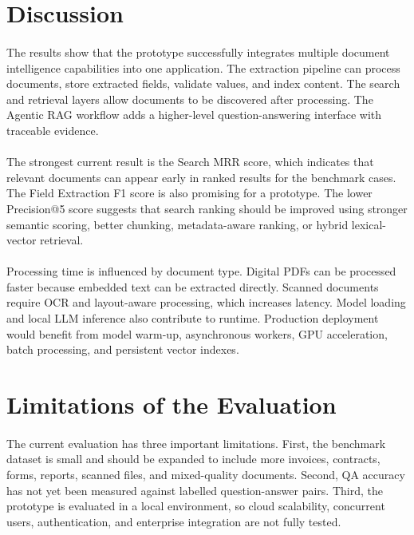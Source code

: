 \section{Discussion}
\paragraph{} The results show that the prototype successfully integrates multiple document intelligence capabilities into one application. The extraction pipeline can process documents, store extracted fields, validate values, and index content. The search and retrieval layers allow documents to be discovered after processing. The Agentic RAG workflow adds a higher-level question-answering interface with traceable evidence.

\paragraph{} The strongest current result is the Search MRR score, which indicates that relevant documents can appear early in ranked results for the benchmark cases. The Field Extraction F1 score is also promising for a prototype. The lower Precision@5 score suggests that search ranking should be improved using stronger semantic scoring, better chunking, metadata-aware ranking, or hybrid lexical-vector retrieval.

\paragraph{} Processing time is influenced by document type. Digital PDFs can be processed faster because embedded text can be extracted directly. Scanned documents require OCR and layout-aware processing, which increases latency. Model loading and local LLM inference also contribute to runtime. Production deployment would benefit from model warm-up, asynchronous workers, GPU acceleration, batch processing, and persistent vector indexes.

\section{Limitations of the Evaluation}
\paragraph{} The current evaluation has three important limitations. First, the benchmark dataset is small and should be expanded to include more invoices, contracts, forms, reports, scanned files, and mixed-quality documents. Second, QA accuracy has not yet been measured against labelled question-answer pairs. Third, the prototype is evaluated in a local environment, so cloud scalability, concurrent users, authentication, and enterprise integration are not fully tested.

